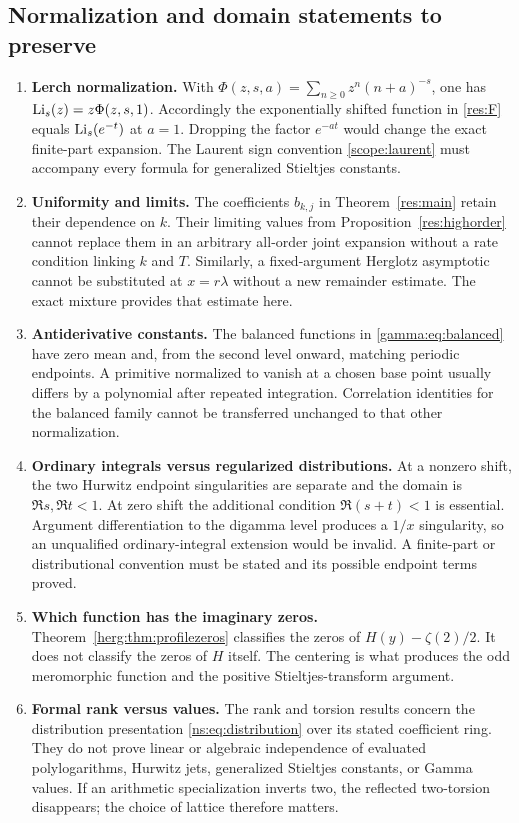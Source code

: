 \subsection{Normalization and domain statements to preserve}
\begin{enumerate}
\item \textbf{Lerch normalization.}
With $\Phi(z,s,a)=\sum_{n\geq0}z^n(n+a)^{-s}$, one has
$\operatorname{Li}_s(z)=z\Phi(z,s,1)$. Accordingly the exponentially shifted function
in \eqref{res:F} equals $\operatorname{Li}_s(e^{-t})$ at $a=1$.
Dropping the factor $e^{-at}$ would change the exact finite-part expansion.
The Laurent sign convention \eqref{scope:laurent} must accompany every
formula for generalized Stieltjes constants.

\item \textbf{Uniformity and limits.}
The coefficients $b_{k,j}$ in Theorem~\ref{res:main} retain their dependence
on $k$. Their limiting values from Proposition~\ref{res:highorder} cannot
replace them in an arbitrary all-order joint expansion without a rate
condition linking $k$ and $T$. Similarly, a fixed-argument Herglotz
asymptotic cannot be substituted at $x=r\lambda$ without a new remainder
estimate. The exact mixture provides that estimate here.

\item \textbf{Antiderivative constants.}
The balanced functions in \eqref{gamma:eq:balanced} have zero mean and,
from the second level onward, matching periodic endpoints. A primitive
normalized to vanish at a chosen base point usually differs by a polynomial
after repeated integration. Correlation identities for the balanced family
cannot be transferred unchanged to that other normalization.

\item \textbf{Ordinary integrals versus regularized distributions.}
At a nonzero shift, the two Hurwitz endpoint singularities are separate and
the domain is $\Re s,\Re t<1$. At zero shift the additional condition
$\Re(s+t)<1$ is essential. Argument differentiation to the digamma level
produces a $1/x$ singularity, so an unqualified ordinary-integral extension
would be invalid. A finite-part or distributional convention must be stated
and its possible endpoint terms proved.

\item \textbf{Which function has the imaginary zeros.}
Theorem~\ref{herg:thm:profilezeros} classifies the zeros of
$H(y)-\zeta(2)/2$. It does not classify the zeros of $H$ itself. The
centering is what produces the odd meromorphic function and the positive
Stieltjes-transform argument.

\item \textbf{Formal rank versus values.}
The rank and torsion results concern the distribution presentation
\eqref{ns:eq:distribution} over its stated coefficient ring. They do not
prove linear or algebraic independence of evaluated polylogarithms,
Hurwitz jets, generalized Stieltjes constants, or Gamma values. If an
arithmetic specialization inverts two, the reflected two-torsion disappears;
the choice of lattice therefore matters.
\end{enumerate}

